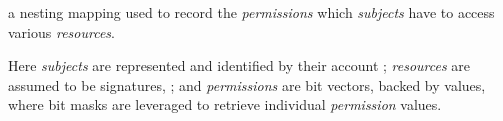 \begin{state}
  \begin{public}
    \item {}
      a nesting mapping used to record the \emph{permissions} which
      \emph{subjects} have to access various \emph{resources}.

      \begin{displayquote}
        Here \emph{subjects} are represented and identified by their account
        ; \emph{resources} are assumed to be 
        signatures, ; and \emph{permissions} are bit vectors,
        backed by  values, where bit masks are leveraged to
        retrieve individual \emph{permission} values.
      \end{displayquote}
  \end{public}
\end{state}

